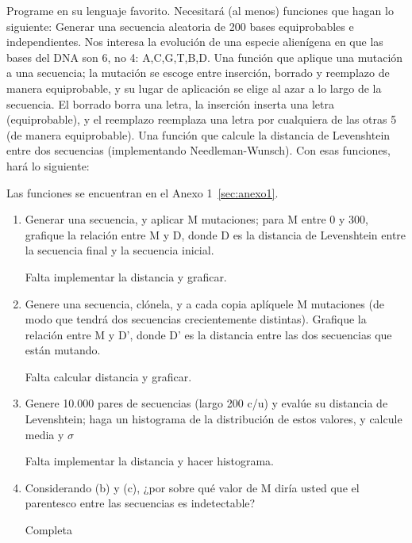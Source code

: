 Programe en su lenguaje favorito. Necesitará (al menos) funciones que hagan lo siguiente:
Generar una secuencia aleatoria de 200 bases equiprobables e independientes. Nos interesa la
evolución de una especie alienígena en que las bases del DNA son 6, no 4: {A,C,G,T,B,D}.
Una función que aplique una mutación a una secuencia; la mutación se escoge entre inserción,
borrado y reemplazo de manera equiprobable, y su lugar de aplicación se elige al azar a lo largo
de la secuencia. El borrado borra una letra, la inserción inserta una letra (equiprobable), y el
reemplazo reemplaza una letra por cualquiera de las otras 5 (de manera equiprobable).
Una función que calcule la distancia de Levenshtein entre dos secuencias (implementando
Needleman-Wunsch).
Con esas funciones, hará lo siguiente:

 Las funciones se encuentran en el Anexo 1~\ref{sec:anexo1}.

\begin{enumerate}

	\item Generar una secuencia, y aplicar M mutaciones; para M entre 0 y 300, grafique la relación
		entre M y D, donde D es la distancia de Levenshtein entre la secuencia final y la secuencia
		inicial.


		 Falta implementar la distancia y graficar.

	\item Genere una secuencia, clónela, y a cada copia aplíquele M mutaciones (de modo que tendrá
		dos secuencias crecientemente distintas). Grafique la relación entre M y D’, donde D’ es la
		distancia entre las dos secuencias que están mutando.


		 Falta calcular distancia y graficar.


	\item Genere 10.000 pares de secuencias (largo 200 c/u) y evalúe su distancia de Levenshtein; haga
		un histograma de la distribución de estos valores, y calcule media y $\sigma$


		 Falta implementar la distancia y hacer histograma.


	\item Considerando (b) y (c), ¿por sobre qué valor de M diría usted que el parentesco entre las
		secuencias es indetectable?


		 Completa


\end{enumerate}
